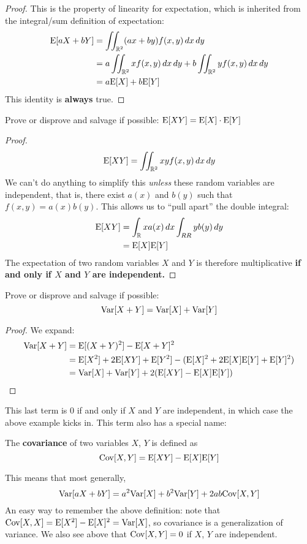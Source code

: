 \documentclass[../main.tex]{subfiles}
\begin{document}
\begin{proof}
This is the property of linearity for expectation, which is inherited from the integral/sum definition of expectation: 
\begin{align*}
    \mathrm E[aX + bY] &= \iint_{\mathbb{R}^2} (ax+by) f(x,y) \,dx \,dy \\
    &= a \iint_{\mathbb{R}^2} x f(x,y) \,dx \,dy + b \iint_{\mathbb{R}^2} y f(x,y) \,dx \,dy \\
    &= a \mathrm E[X] + b\mathrm E[Y]
\end{align*}
This identity is \textbf{always} true. 
\end{proof}

\begin{example}
    Prove or disprove and salvage if possible: $\mathrm E[XY] = \mathrm E[X] \cdot \mathrm E[Y]$
\end{example}

\begin{proof}
\[ \mathrm E[XY] = \iint_{\mathbb{R}^2} xy f(x,y) \,dx \,dy\]
We can't do anything to simplify this \textit{unless} these random variables are independent, that is, there exist $a(x)$ and $b(y)$ such that $f(x,y) = a(x) b(y)$. This allows us to ``pull apart'' the double integral: 
\begin{align*}
    \mathrm E[XY] &= \int_{\mathbb{R}} x a(x) \,dx \int_{RR} y b(y) \,dy \\
    &= \mathrm E[X] \mathrm E[Y] 
\end{align*}
The expectation of two random variables $X$ and $Y$ is therefore multiplicative \textbf{if and only if $X$ and $Y$ are independent.}
\end{proof}

\begin{example}
    Prove or disprove and salvage if possible: \[ \mathrm{Var}[X+Y] = \mathrm{Var}[X] + \mathrm{Var}[Y]\] 
\end{example}
\begin{proof}
We expand: 
\begin{align*}
    \mathrm{Var}[X+Y] &= \mathrm E[(X+Y)^2] - \mathrm E[X+Y]^2 \\
    &= \mathrm E[X^2] + 2\mathrm E[XY] + \mathrm E[Y^2] - (\mathrm E[X]^2 + 2\mathrm E[X] \mathrm E[Y] + \mathrm E[Y]^2) \\
    &= \mathrm{Var}[X] + \mathrm{Var}[Y] + 2(\mathrm E[XY] - \mathrm E[X] \mathrm E[Y])
\end{align*}
\end{proof}
This last term is $0$ if and only if $X$ and $Y$ are independent, in which case the above example kicks in. This term also has a special name: 
\begin{definition}
The \textbf{covariance} of two variables $X$, $Y$ is defined as
\[
    \mathrm{Cov}[X, Y] = \mathrm E[XY] - \mathrm E[X] \mathrm E[Y]
\]
\end{definition}
This means that most generally, 
\[
    \mathrm{Var}[aX + bY] = a^2 \mathrm{Var}[X] + b^2 \mathrm{Var}[Y] + 2ab \mathrm{Cov}[X, Y]
\]
An easy way to remember the above definition: note that $\mathrm{Cov}[X, X] = \mathrm E[X^2] - \mathrm E[X]^2 = \mathrm{Var}[X]$, so covariance is a generalization of variance. We also see above that $\mathrm{Cov}[X,Y] = 0$ if $X$, $Y$ are independent. 
\end{document}

